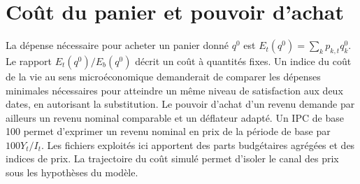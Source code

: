 \section{Coût du panier et pouvoir d'achat}
La dépense nécessaire pour acheter un panier donné $q^0$ est $E_t(q^0)=\sum_k p_{k,t}q_k^0$. Le rapport $E_t(q^0)/E_b(q^0)$ décrit un coût à quantités fixes. Un indice du coût de la vie au sens microéconomique demanderait de comparer les dépenses minimales nécessaires pour atteindre un même niveau de satisfaction aux deux dates, en autorisant la substitution. Le pouvoir d'achat d'un revenu demande par ailleurs un revenu nominal comparable et un déflateur adapté. Un IPC de base 100 permet d'exprimer un revenu nominal en prix de la période de base par $100Y_t/I_t$. Les fichiers exploités ici apportent des parts budgétaires agrégées et des indices de prix. La trajectoire du coût simulé permet d'isoler le canal des prix sous les hypothèses du modèle.
